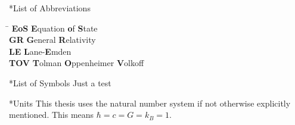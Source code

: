 \thispagestyle{empty}
\begin{section}*{List of Abbreviations}
\begin{tabbing}
\hspace{2cm}\= \kill
\textbf{EoS}        \> \textbf{E}quation \textbf{o}f \textbf{S}tate\\
\textbf{GR} 		\> \textbf{G}eneral \textbf{R}elativity \\
\textbf{LE}			\> \textbf{L}ane-\textbf{E}mden\\
\textbf{TOV}		\> \textbf {T}olman \textbf{O}ppenheimer \textbf{V}olkoff


\end{tabbing}


\end{section}
\begin{section}*{List of Symbols}
	Just a test
\end{section}

\begin{section}*{Units}
This thesis uses the natural number system if not otherwise explicitly mentioned. This means $\hbar=c=G=k_B=1$.
\end{section}
